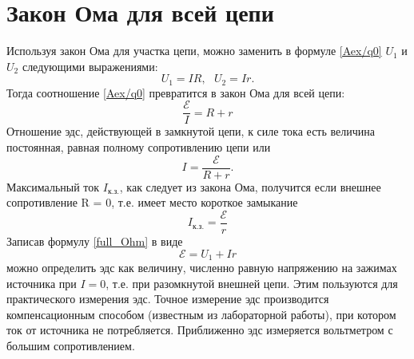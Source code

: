 \documentclass[a4paper,10pt]{book}
\begin{document}
\section{Закон Ома для всей цепи}
Используя закон Ома для участка цепи, можно заменить в формуле \ref{Aex/q0} $U_1$ и $U_2$ следующими выражениями:
\begin{equation*}
 U_1 = IR,\text{ }U_2 = Ir.
\end{equation*}
Тогда соотношение \ref{Aex/q0} превратится в закон Ома для всей цепи: 
\begin{equation}\label{full_Ohm}
 \frac{\mathcal{E}}{I} = R + r
\end{equation}
Отношение эдс, действующей в замкнутой цепи, к силе тока есть величина постоянная, равная полному сопротивлению цепи или 
\begin{equation}\label{full_I}
 I = \frac{\mathcal{E}}{R + r}.
\end{equation}
Максимальный ток $I_\text{к.з.}$, как следует из закона Ома, получится если внешнее сопротивление R = 0, т.е. имеет место короткое замыкание
\begin{equation}\label{I_shcut}
 I_\text{к.з.} = \frac{\mathcal{E}}{r}
\end{equation}
Записав формулу \ref{full_Ohm} в виде
\begin{equation*}
 \mathcal{E} = U_1 + Ir
\end{equation*}
можно определить эдс как величину, численно равную напряжению на зажимах источника при $I = 0$, т.е. при разомкнутой внешней цепи. Этим пользуются для практического измерения эдс. Точное измерение эдс производится компенсационным способом (известным из лабораторной работы), при котором ток от источника не потребляется. Приближенно эдс измеряется вольтметром с большим сопротивлением.
\end{document}
